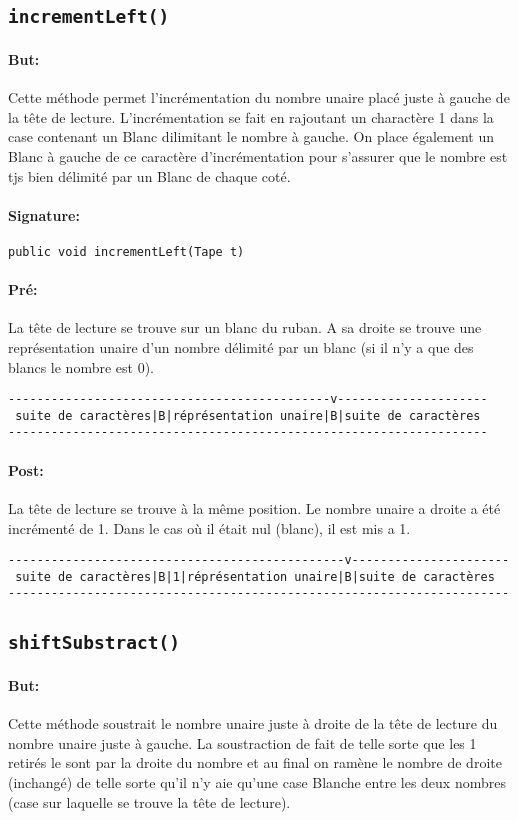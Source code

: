 \documentclass[a4paper,11pt]{article}
\begin{document}
\subsection{\texttt{incrementLeft()}}
\paragraph{But:} Cette méthode permet l'incrémentation du nombre unaire placé juste à gauche de la tête de lecture. L'incrémentation se fait en rajoutant un charactère 1 dans la case contenant un Blanc dilimitant le nombre à gauche. On place également un Blanc à gauche de ce caractère d'incrémentation pour s'assurer que le nombre est tjs bien délimité par un Blanc de chaque coté.
\paragraph{Signature:} \texttt{public void incrementLeft(Tape t)}
\paragraph{Pré:} 
La tête de lecture se trouve sur un blanc du ruban. A sa droite se trouve une représentation unaire d'un nombre délimité par un blanc (si il n'y a que des blancs le nombre est 0).
\begin{verbatim}
---------------------------------------------v---------------------
 suite de caractères|B|réprésentation unaire|B|suite de caractères
-------------------------------------------------------------------
\end{verbatim}
\paragraph{Post:}
La tête de lecture se trouve à la même position. Le nombre unaire a droite a été incrémenté de 1. Dans le cas où il était nul (blanc), il est mis a 1.
\begin{verbatim}
-----------------------------------------------v----------------------
 suite de caractères|B|1|réprésentation unaire|B|suite de caractères
----------------------------------------------------------------------
\end{verbatim}
\subsection{\texttt{shiftSubstract()}}
\paragraph{But:} Cette méthode soustrait le nombre unaire juste à droite de la tête de lecture du nombre unaire juste à gauche. La soustraction de fait de telle sorte que les 1 retirés le sont par la droite du nombre et au final on ramène le nombre de droite (inchangé) de telle sorte qu'il n'y aie qu'une case Blanche entre les deux nombres (case sur laquelle se trouve la tête de lecture).
\end{document}
